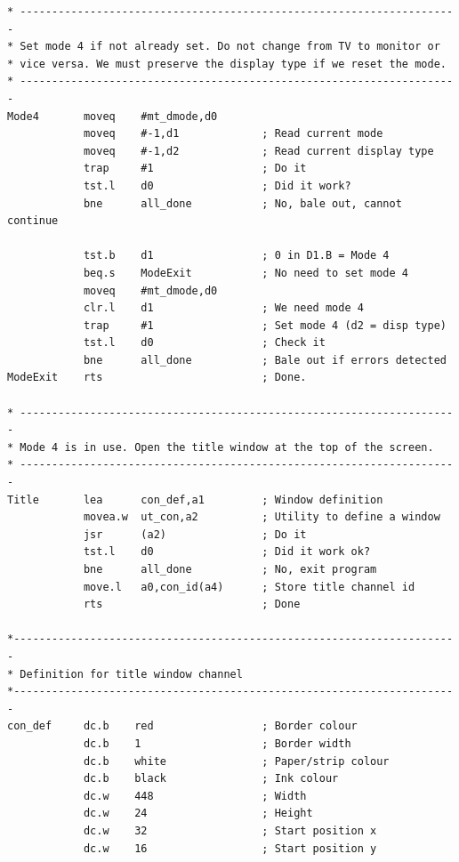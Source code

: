 \begin{lstlisting}[firstnumber=last,caption={Linked Lists - Wrapper - Part 2},label={LinkedListsWrapperPart2}]
* ---------------------------------------------------------------------
* Set mode 4 if not already set. Do not change from TV to monitor or
* vice versa. We must preserve the display type if we reset the mode.
* ---------------------------------------------------------------------
Mode4       moveq    #mt_dmode,d0
            moveq    #-1,d1             ; Read current mode
            moveq    #-1,d2             ; Read current display type
            trap     #1                 ; Do it
            tst.l    d0                 ; Did it work?
            bne      all_done           ; No, bale out, cannot continue

            tst.b    d1                 ; 0 in D1.B = Mode 4
            beq.s    ModeExit           ; No need to set mode 4
            moveq    #mt_dmode,d0
            clr.l    d1                 ; We need mode 4
            trap     #1                 ; Set mode 4 (d2 = disp type)
            tst.l    d0                 ; Check it
            bne      all_done           ; Bale out if errors detected
ModeExit    rts                         ; Done.

* ---------------------------------------------------------------------
* Mode 4 is in use. Open the title window at the top of the screen.
* ---------------------------------------------------------------------
Title       lea      con_def,a1         ; Window definition
            movea.w  ut_con,a2          ; Utility to define a window
            jsr      (a2)               ; Do it
            tst.l    d0                 ; Did it work ok?
            bne      all_done           ; No, exit program
            move.l   a0,con_id(a4)      ; Store title channel id
            rts                         ; Done

*----------------------------------------------------------------------
* Definition for title window channel
*----------------------------------------------------------------------
con_def     dc.b    red                 ; Border colour
            dc.b    1                   ; Border width
            dc.b    white               ; Paper/strip colour
            dc.b    black               ; Ink colour
            dc.w    448                 ; Width
            dc.w    24                  ; Height
            dc.w    32                  ; Start position x
            dc.w    16                  ; Start position y


\end{lstlisting}
